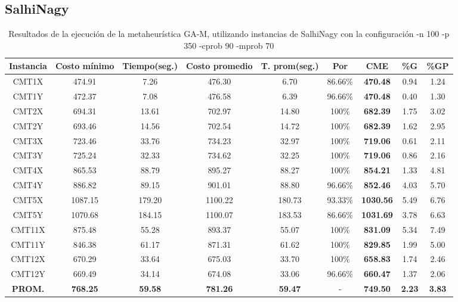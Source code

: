 \subsection{SalhiNagy}\label{tablas-entonacion-GA-M-salhinagy}

\begin{table}[ht]
\caption{Resultados de la ejecución de la metaheurística GA-M, utilizando instancias de SalhiNagy con la configuración -n 100 -p 350 -cprob 90 -mprob 70}
\centering
\small
\begin{tabular}{c c c c c c c c c}
\hline\hline
Instancia & Costo mínimo & Tiempo(seg.) & Costo promedio & T. prom(seg.) & Por & CME & \%G & \%GP \\ [0.5ex]
\hline
CMT1X & 474.91 & 7.26 & 
476.30 & 6.70 & 86.66\% & \bf{470.48} & 
0.94 & 1.24\\CMT1Y & 472.37 & 7.08 & 
476.58 & 6.39 & 96.66\% & \bf{470.48} & 
0.40 & 1.30\\CMT2X & 694.31 & 13.61 & 
702.97 & 14.80 & 100\% & \bf{682.39} & 
1.75 & 3.02\\CMT2Y & 693.46 & 14.56 & 
702.54 & 14.72 & 100\% & \bf{682.39} & 
1.62 & 2.95\\CMT3X & 723.46 & 33.76 & 
734.23 & 32.97 & 100\% & \bf{719.06} & 
0.61 & 2.11\\CMT3Y & 725.24 & 32.33 & 
734.62 & 32.25 & 100\% & \bf{719.06} & 
0.86 & 2.16\\CMT4X & 865.53 & 88.79 & 
895.27 & 88.27 & 100\% & \bf{854.21} & 
1.33 & 4.81\\CMT4Y & 886.82 & 89.15 & 
901.01 & 88.80 & 96.66\% & \bf{852.46} & 
4.03 & 5.70\\CMT5X & 1087.15 & 179.20 & 
1100.22 & 180.73 & 93.33\% & \bf{1030.56} & 
5.49 & 6.76\\CMT5Y & 1070.68 & 184.15 & 
1100.07 & 183.53 & 86.66\% & \bf{1031.69} & 
3.78 & 6.63\\CMT11X & 875.48 & 55.28 & 
893.37 & 55.07 & 100\% & \bf{831.09} & 
5.34 & 7.49\\CMT11Y & 846.38 & 61.17 & 
871.31 & 61.62 & 100\% & \bf{829.85} & 
1.99 & 5.00\\CMT12X & 670.29 & 33.64 & 
675.03 & 33.70 & 100\% & \bf{658.83} & 
1.74 & 2.46\\CMT12Y & 669.49 & 34.14 & 
674.08 & 33.06 & 96.66\% & \bf{660.47} & 
1.37 & 2.06\\\bf{PROM.} & 
\bf{768.25} & \bf{59.58} & \bf{781.26} & \bf{59.47} & - & \bf{749.50} & \bf{2.23} & \bf{3.83}\\[1ex]\hline
\end{tabular}
\label{table:GA-M-porcentajeS}
\end{table} \clearpage

